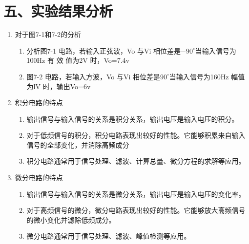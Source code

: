 \documentclass[a4paper,10pt,notitlepage]{article}
\begin{document}
	\section*{五、实验结果分析}
	\begin{enumerate}
		\item 对于图7-1和7-2的分析
		\begin{enumerate}
			\item 分析图7-1 电路，若输入正弦波，Vo 与Vi 相位差是$-90^{\circ}$当输入信号为100Hz 有 效
			值为2V 时，Vo=7.4v
			\item 图7-2 电路，若输入方波，Vo 与Vi 相位差是$90^{\circ}$当输入信号为160Hz 幅值为lV
			时，输出Vo=6v
		\end{enumerate}
		\item 积分电路的特点
		\begin{enumerate}
			\item 输出信号与输入信号的关系是积分关系，输出电压是输入电压的积分。
			\item 对于低频信号的积分，积分电路表现出较好的性能。它能够积累来自输入信号的全部变化，并消除高频成分
			\item 积分电路通常用于信号处理、滤波、计算总量、微分方程的求解等应用。
		\end{enumerate}
		\item 微分电路的特点
		\begin{enumerate}
			\item 输出信号与输入信号的关系是微分关系，输出电压是输入电压的变化率。
			\item 对于高频信号的微分，微分电路表现出较好的性能。它能够放大高频信号的微小变化并滤除低频成分。
			\item 微分电路通常用于信号处理、滤波、峰值检测等应用。
		\end{enumerate}
	\end{enumerate}
\end{document}
